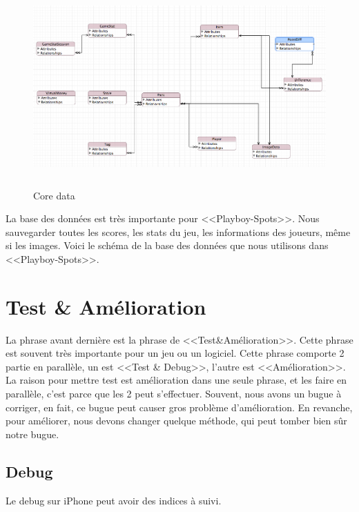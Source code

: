 \begin{figure}[htbp]
	\centering
		\includegraphics[height=3in]{Image/coredata.png}
	\caption{Core data}
	\label{fig:Image_coredata}
\end{figure}
La base des données est très importante pour <<Playboy-Spots>>. Nous sauvegarder toutes les scores, les stats du jeu, les informations des joueurs, même si les images. 
Voici le schéma de la base des données que nous utilisons dans <<Playboy-Spots>>.




\section{Test \& Amélioration} %
\label{sec:test_&_amélioration}

La phrase avant dernière est la phrase de <<Test\&Amélioration>>. Cette phrase est souvent très importante pour un jeu ou un logiciel. Cette phrase comporte 2 partie en parallèle, un est <<Test \& Debug>>, l'autre est <<Amélioration>>. La raison pour mettre test est amélioration dans une seule phrase, et les faire en parallèle, c'est parce que les 2 peut s’effectuer. Souvent, nous avons un bugue à corriger, en fait, ce bugue peut causer gros problème d'amélioration. En revanche, pour améliorer, nous devons changer quelque méthode, qui peut tomber bien sûr notre bugue.

\subsection{Debug} %
\label{sub:debug}

Le debug sur iPhone peut avoir des indices à suivi. 

